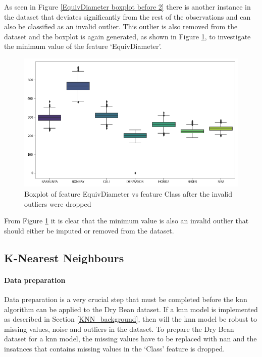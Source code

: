 \documentclass[10pt, conference]{IEEEtran}
\begin{document}
As seen in Figure \ref{EquivDiameter boxplot before 2} there is another instance in the dataset that deviates
significantly from the rest of the observations and can also be classified as an invalid outlier. This outlier
is also removed from the dataset and the boxplot is again generated, as shown in Figure
\ref{EquivDiameter boxplot before 3}, to investigate the minimum value of the feature `EquivDiameter'.
\begin{figure}[H]
    \centerline{\includegraphics[scale=0.35]{../Plots/EquivDiameter outlier boxplot 3.png}}
    \caption{Boxplot of feature EquivDiameter vs feature Class after the invalid outliers were dropped}
    \label{EquivDiameter boxplot before 3}
\end{figure}

From Figure \ref{EquivDiameter boxplot before 3} it is clear that the minimum value is also an invalid outlier
that should either be imputed or removed from the dataset.

\subsection{K-Nearest Neighbours}

\paragraph{Data preparation}

Data preparation is a very crucial step that must be completed before the \acrshort{knn} algorithm can be applied to the Dry
Bean dataset. If a \acrshort{knn} model is implemented as described in Section \ref{KNN_background}, then
will the \acrshort{knn} model be robust to missing values, noise and outliers in the dataset. To prepare
the Dry Bean dataset for a \acrshort{knn} model, the missing values have to be replaced with \acrshort{nan}
and the insatnces that contains missing values in the `Class' feature is dropped.
\end{document}

